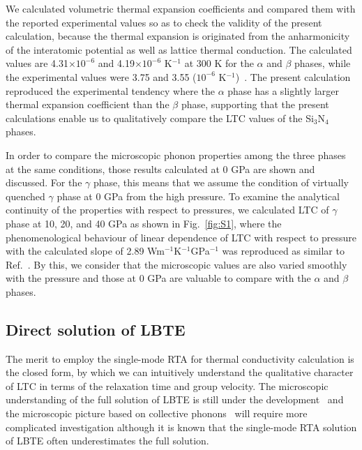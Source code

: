 \documentclass[twocolumn,amsmath,amssymb,a4paper,prb,superscriptaddress,floatfix]{revtex4-1}
\begin{document}
We calculated volumetric thermal expansion coefficients and compared them with
the reported experimental values so as to check the validity of the present
calculation, because the thermal expansion is originated from the anharmonicity
of the interatomic potential as well as lattice thermal conduction. The
calculated values are 4.31$\times 10^{-6}$ and 4.19$\times 10^{-6}$ K$^{-1}$ at
300 K for the $\alpha$ and $\beta$ phases, while the experimental values were
3.75 and 3.55 ($10^{-6}$ K$^{-1}$)~\cite{minikayev-alpha}. The present
calculation reproduced the experimental tendency where the $\alpha$ phase has a
slightly larger thermal expansion coefficient than the $\beta$ phase,
supporting that the present calculations enable us to qualitatively compare the
LTC values of the Si$_3$N$_4$ phases.

In order to compare the microscopic phonon properties among the three phases at
the same conditions, those results calculated at 0 GPa are shown and discussed.
For the $\gamma$ phase, this means that we assume the condition of virtually
quenched $\gamma$ phase at 0 GPa from the high pressure. To examine the
analytical continuity of the properties with respect to pressures, we
calculated LTC of $\gamma$ phase at 10, 20, and 40 GPa as shown in
Fig.~\ref{fig:S1}, where the phenomenological behaviour of linear dependence of
LTC with respect to pressure with the calculated slope of 2.89
Wm$^{-1}$K$^{-1}$GPa$^{-1}$ was reproduced as similar to
Ref.~. By this, we consider that the microscopic
values are also varied smoothly with the pressure and those at 0 GPa are
valuable to compare with the $\alpha$ and $\beta$ phases.

\subsection{Direct solution of LBTE}

The merit to employ the single-mode RTA for thermal conductivity calculation is
the closed form, by which we can intuitively understand the qualitative
character of LTC in terms of the relaxation time and group velocity. The
microscopic understanding of the full solution of LBTE is still under the
development~\cite{cepellotti-relaxons} and the microscopic picture based on
collective phonons~\cite{hardy-collective} will require more complicated
investigation although it is known that the single-mode RTA solution of LBTE
often underestimates the full solution.~\cite{mukhopadhyay-ltc,ward-ltc}
\end{document}
